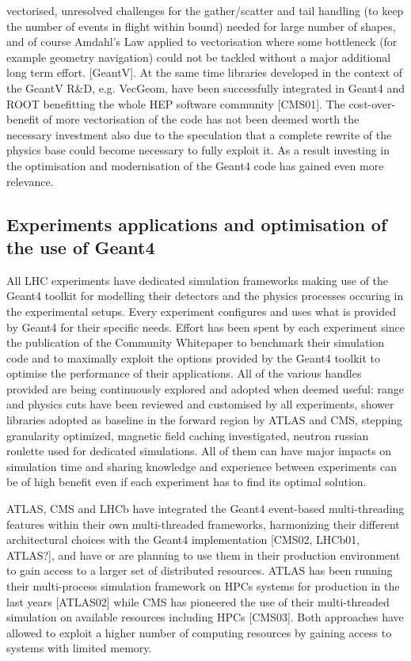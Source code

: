 \documentclass[11pt,a4paper]{article}
\begin{document}
vectorised, unresolved challenges for the gather/scatter and tail
handling (to keep the number of events in flight within bound) needed
for large number of shapes, and of course Amdahl's Law applied to
vectorisation where some bottleneck (for example geometry navigation)
could not be tackled without a major additional long term effort.
{[}GeantV{]}. At the same time libraries developed in the context of the
GeantV R\&D, e.g. VecGeom, have been successfully integrated in Geant4
and ROOT benefitting the whole HEP software community {[}CMS01{]}. The
cost-over-benefit of more vectorisation of the code has not been deemed
worth the necessary investment also due to the speculation that a
complete rewrite of the physics base could become necessary to fully
exploit it. As a result investing in the optimisation and modernisation
of the Geant4 code has gained even more relevance.

\hypertarget{experiments-applications-and-optimisation-of-the-use-of-geant4}{%
\subsection{Experiments applications and optimisation of the use of
Geant4}\label{experiments-applications-and-optimisation-of-the-use-of-geant4}}

All LHC experiments have dedicated simulation frameworks making use of
the Geant4 toolkit for modelling their detectors and the physics
processes occuring in the experimental setups. Every experiment
configures and uses what is provided by Geant4 for their specific needs.
Effort has been spent by each experiment since the publication of the
Community Whitepaper to benchmark their simulation code and to maximally
exploit the options provided by the Geant4 toolkit to optimise the
performance of their applications. All of the various handles provided
are being continuously explored and adopted when deemed useful: range
and physics cuts have been reviewed and customised by all experiments,
shower libraries adopted as baseline in the forward region by ATLAS and
CMS, stepping granularity optimized, magnetic field caching
investigated, neutron russian roulette used for dedicated simulations.
All of them can have major impacts on simulation time and sharing
knowledge and experience between experiments can be of high benefit even
if each experiment has to find its optimal solution.

ATLAS, CMS and LHCb have integrated the Geant4 event-based
multi-threading features within their own multi-threaded frameworks,
harmonizing their different architectural choices with the Geant4
implementation {[}CMS02, LHCb01, ATLAS?{]}, and have or are planning to
use them in their production environment to gain access to a larger set
of distributed resources. ATLAS has been running their multi-process
simulation framework on HPCs systems for production in the last years
{[}ATLAS02{]} while CMS has pioneered the use of their multi-threaded
simulation on available resources including HPCs {[}CMS03{]}. Both
approaches have allowed to exploit a higher number of computing
resources by gaining access to systems with limited memory.
\end{document}
